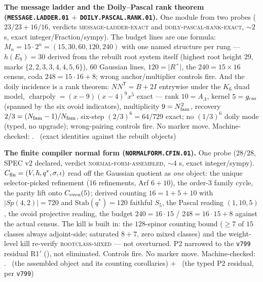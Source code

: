 \par\smallskip\noindent\textbf{The message ladder and the
Doily--Pascal rank theorem (\texttt{MESSAGE.LADDER.01} $+$
\texttt{DOILY.PASCAL.RANK.01}).}
One module from two probes ($23/23 + 16/16$, verdicts
\textsc{message-ladder-exact} and
\textsc{doily-pascal-rank-exact}, ${\sim}2$ s, exact
integer/Fraction/sympy).  The budget lines are one formula:
$M_n = 15\cdot2^n = (15, 30, 60, 120, 240)$ with one named
structure per rung --- $h(E_8) = 30$ derived from the rebuilt
root system itself (highest root height $29$, marks
$\{2,2,3,3,4,4,5,6\}$), $60$ Gaussian lines, $120 = \lvert
R^+\rvert$, the $240 = 15\times16$ census, coda $248 = 15\cdot16
+ 8$; wrong anchor/multiplier controls fire.  And the doily
incidence is a rank theorem: $NN^{\mathsf T} = B + 2I$ entrywise
under the $K_6$ duad model, $\operatorname{charpoly} =
(x-9)(x-4)^9x^5$ exact --- rank $10 = A_\Lambda$, kernel
$5 = g_{\mathrm{car}}$ (spanned by the six ovoid indicators), multiplicity
$9 = N_{\mathrm{fam}}^2$, recovery $2/3 = (N_{\mathrm{fam}}-1)/N_{\mathrm{fam}}$, six-step
$(2/3)^6 = 64/729$ exact; no $(1/3)^6$ doily mode (typed, no
upgrade); wrong-pairing controls fire.  No marker move.
Machine-checked: .
\mE\ (exact identities against the rebuilt objects)
\par\smallskip

\par\smallskip\noindent\textbf{The finite compiler normal form
(\texttt{NORMALFORM.CFIN.01}).}
One probe ($28/28$, SPEC v2 declared, verdict
\textsc{normal-form-assembled}, ${\sim}4$ s, exact
integer/sympy).  $C_{\rm fin} = (V, \hbar, q^{*}, \sigma, \iota)$
read off the Gaussian quotient as \emph{one} object: the unique
selector-picked refinement ($16$ refinements, Arf $6 + 10$), the
order-$3$ family cycle, the parity lift onto $C_{\rm even}(5)$;
derived counting $16 = 1 + 5 + 10$ with $\lvert Sp(4,2)\rvert =
720$ and $\mathrm{Stab}(q^{*}) = 120$ faithful $S_5$, the Pascal
reading $(1, 10, 5)$, the ovoid projective reading, the budget
$240 = 16\cdot15$ / $248 = 16\cdot15 + 8$ against the actual
census.  The kill is built in: the $128$-spinor counting bound
($\ge 7$ of $15$ classes always adjoint-side; saturated $8 + 7$,
zero mixed classes) and the weight-level kill re-verify
\textsc{rootclass-mixed} --- not overturned.  P2 narrowed to the
\texttt{v799} residual R1$'$ (\mC), not eliminated.  Controls
fire.  No marker move.
Machine-checked: .
\mE\ (the assembled object and its counting corollaries) $+$
\mC\ (the typed P2 residual, per \texttt{v799})
\par\smallskip

